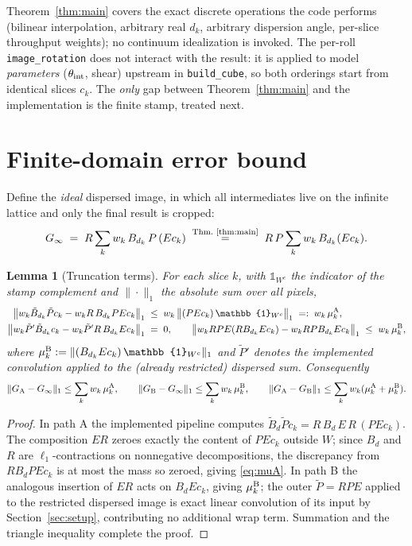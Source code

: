 \documentclass[11pt]{article}
\newtheorem{lemma}{Lemma}
\newcommand{\code}[1]{\texttt{#1}}
\begin{document}
Theorem~\ref{thm:main} covers the exact discrete operations the code performs
(bilinear interpolation, arbitrary real $d_k$, arbitrary dispersion angle,
per-slice throughput weights); no continuum idealization is invoked. The
per-roll \code{image\_rotation} does not interact with the result: it is
applied to model \emph{parameters} ($\theta_{\rm int}$, shear) upstream in
\code{build\_cube}, so both orderings start from identical slices $c_k$.
The \emph{only} gap between Theorem~\ref{thm:main} and the implementation is
the finite stamp, treated next.

\section{Finite-domain error bound}
\label{sec:finite}

Define the \emph{ideal} dispersed image, in which all intermediates live on
the infinite lattice and only the final result is cropped:
\[
G_\infty \;=\; R \sum_k w_k\, B_{d_k}\, P\, (E c_k)
\;\overset{\text{Thm.~\ref{thm:main}}}{=}\;
R\, P \sum_k w_k\, B_{d_k} (E c_k).
\]

\begin{lemma}[Truncation terms]
\label{lem:trunc}
For each slice $k$, with $\mathbb{1}_{W^c}$ the indicator of the stamp
complement and $\|\cdot\|_1$ the absolute sum over all pixels,
\begin{align}
\big\| w_k \tilde B_{d_k} \tilde P c_k - w_k R\,B_{d_k} P E c_k \big\|_1
&\;\le\; w_k \,\big\| (P E c_k)\,\mathbb{1}_{W^c} \big\|_1
\;=:\; w_k\, \mu_k^{\rm A},
\label{eq:muA}\\
\big\| w_k \tilde P' \tilde B_{d_k} c_k - w_k \tilde P' R\, B_{d_k} E c_k \big\|_1
&\;=\; 0,
\qquad
\big\| w_k R P E (R B_{d_k} E c_k) - w_k R P B_{d_k} E c_k \big\|_1
\;\le\; w_k\, \mu_k^{\rm B},
\label{eq:muB}
\end{align}
where $\mu_k^{\rm B} := \| (B_{d_k} E c_k)\,\mathbb{1}_{W^c} \|_1$ and
$\tilde P'$ denotes the implemented convolution applied to the (already
restricted) dispersed sum. Consequently
\[
\| G_{\rm A} - G_\infty \|_1 \le \sum_k w_k\, \mu_k^{\rm A},
\qquad
\| G_{\rm B} - G_\infty \|_1 \le \sum_k w_k\, \mu_k^{\rm B},
\qquad
\| G_{\rm A} - G_{\rm B} \|_1 \le \sum_k w_k (\mu_k^{\rm A} + \mu_k^{\rm B}).
\]
\end{lemma}
\begin{proof}
In path A the implemented pipeline computes
$\tilde B_{d} \tilde P c_k = R\,B_{d}\,E\,R\,(P E c_k)$. The composition
$E R$ zeroes exactly the content of $P E c_k$ outside $W$; since $B_d$ and
$R$ are $\ell_1$-contractions on nonnegative decompositions, the discrepancy
from $R B_d P E c_k$ is at most the mass so zeroed, giving \eqref{eq:muA}.
In path B the analogous insertion of $E R$ acts on $B_{d} E c_k$, giving
$\mu_k^{\rm B}$; the outer $\tilde P = R P E$ applied to the restricted
dispersed image is exact linear convolution of its input by
Section~\ref{sec:setup}, contributing no additional wrap term. Summation and
the triangle inequality complete the proof.
\end{proof}
\end{document}
